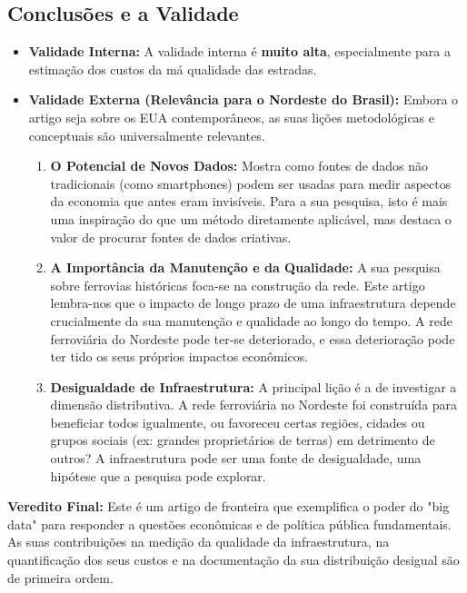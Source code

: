 \documentclass[12pt, a4paper]{article}
\begin{document}
\subsection{Conclusões e a Validade}
\begin{itemize}
    \item \textbf{Validade Interna:} A validade interna é \textbf{muito alta}, especialmente para a estimação dos custos da má qualidade das estradas.
    \item \textbf{Validade Externa (Relevância para o Nordeste do Brasil):} Embora o artigo seja sobre os EUA contemporâneos, as suas lições metodológicas e conceptuais são universalmente relevantes.
        \begin{enumerate}
            \item \textbf{O Potencial de Novos Dados:} Mostra como fontes de dados não tradicionais (como smartphones) podem ser usadas para medir aspectos da economia que antes eram invisíveis. Para a sua pesquisa, isto é mais uma inspiração do que um método diretamente aplicável, mas destaca o valor de procurar fontes de dados criativas.
            \item \textbf{A Importância da Manutenção e da Qualidade:} A sua pesquisa sobre ferrovias históricas foca-se na construção da rede. Este artigo lembra-nos que o impacto de longo prazo de uma infraestrutura depende crucialmente da sua manutenção e qualidade ao longo do tempo. A rede ferroviária do Nordeste pode ter-se deteriorado, e essa deterioração pode ter tido os seus próprios impactos econômicos.
            \item \textbf{Desigualdade de Infraestrutura:} A principal lição é a de investigar a dimensão distributiva. A rede ferroviária no Nordeste foi construída para beneficiar todos igualmente, ou favoreceu certas regiões, cidades ou grupos sociais (ex: grandes proprietários de terras) em detrimento de outros? A infraestrutura pode ser uma fonte de desigualdade, uma hipótese que a pesquisa pode explorar.
        \end{enumerate}
\end{itemize}

\noindent\textbf{Veredito Final:} Este é um artigo de fronteira que exemplifica o poder do "big data" para responder a questões econômicas e de política pública fundamentais. As suas contribuições na medição da qualidade da infraestrutura, na quantificação dos seus custos e na documentação da sua distribuição desigual são de primeira ordem. 
\end{document}
